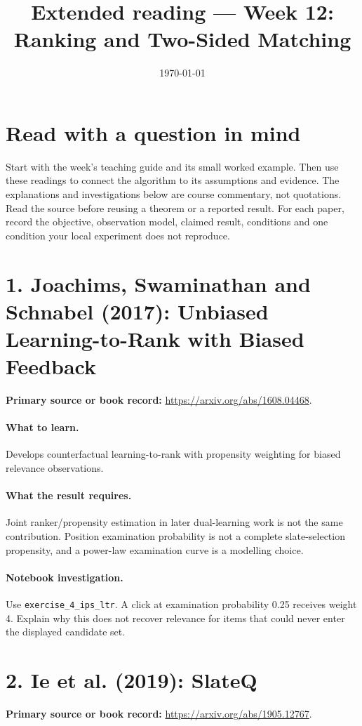 \documentclass[11pt]{scrartcl}
\title{Extended reading --- Week 12: Ranking and Two-Sided Matching}
\date{\today}
\begin{document}
\maketitle
\section*{Read with a question in mind}
Start with the week's teaching guide and its small worked example. Then use
these readings to connect the algorithm to its assumptions and evidence.
The explanations and investigations below are course commentary, not
quotations. Read the source before reusing a theorem or a reported result.
For each paper, record the objective, observation model, claimed result,
conditions and one condition your local experiment does not reproduce.

\section*{1. Joachims, Swaminathan and Schnabel (2017): Unbiased Learning-to-Rank with Biased Feedback}
\textbf{Primary source or book record:} \url{https://arxiv.org/abs/1608.04468}.

\paragraph{What to learn.} Develops counterfactual learning-to-rank with propensity weighting for biased relevance observations.

\paragraph{What the result requires.} Joint ranker/propensity estimation in later dual-learning work is not the same contribution. Position examination probability is not a complete slate-selection propensity, and a power-law examination curve is a modelling choice.

\paragraph{Notebook investigation.} Use \texttt{exercise\_4\_ips\_ltr}. A click at examination probability 0.25 receives weight 4. Explain why this does not recover relevance for items that could never enter the displayed candidate set.

\section*{2. Ie et al. (2019): SlateQ}
\textbf{Primary source or book record:} \url{https://arxiv.org/abs/1905.12767}.
\end{document}
